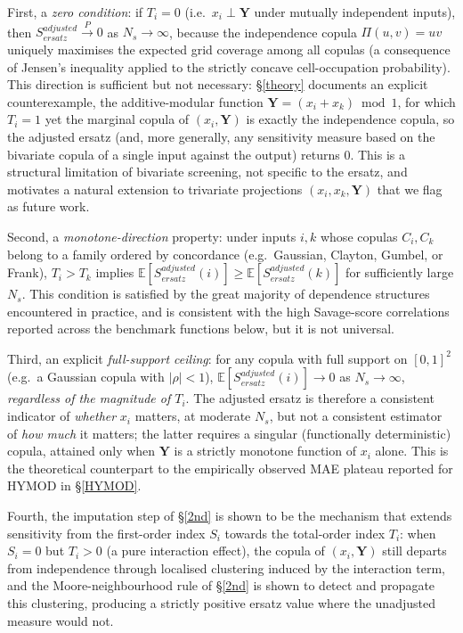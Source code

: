 \documentclass[12pt]{article}
\begin{document}
First, a \emph{zero condition}: if $T_i = 0$ (i.e.\ $x_i \perp \bm Y$ under mutually independent inputs), then $S^{adjusted}_{ersatz} \xrightarrow{P} 0$ as $N_s \to \infty$, because the independence copula $\Pi(u,v)=uv$ uniquely maximises the expected grid coverage among all copulas (a consequence of Jensen's inequality applied to the strictly concave cell-occupation probability). This direction is sufficient but not necessary: \S\ref{theory} documents an explicit counterexample, the additive-modular function $\bm Y = (x_i + x_k) \bmod 1$, for which $T_i = 1$ yet the marginal copula of $(x_i, \bm Y)$ is exactly the independence copula, so the adjusted ersatz (and, more generally, any sensitivity measure based on the bivariate copula of a single input against the output) returns $0$. This is a structural limitation of bivariate screening, not specific to the ersatz, and motivates a natural extension to trivariate projections $(x_i, x_k, \bm Y)$ that we flag as future work.

Second, a \emph{monotone-direction} property: under inputs $i, k$ whose copulas $C_i, C_k$ belong to a family ordered by concordance (e.g.\ Gaussian, Clayton, Gumbel, or Frank), $T_i > T_k$ implies $\mathbb{E}[S^{adjusted}_{ersatz}(i)] \ge \mathbb{E}[S^{adjusted}_{ersatz}(k)]$ for sufficiently large $N_s$. This condition is satisfied by the great majority of dependence structures encountered in practice, and is consistent with the high Savage-score correlations reported across the benchmark functions below, but it is not universal.

Third, an explicit \emph{full-support ceiling}: for any copula with full support on $[0,1]^2$ (e.g.\ a Gaussian copula with $|\rho|<1$), $\mathbb{E}[S^{adjusted}_{ersatz}(i)] \to 0$ as $N_s \to \infty$, \emph{regardless of the magnitude of $T_i$}. The adjusted ersatz is therefore a consistent indicator of \emph{whether} $x_i$ matters, at moderate $N_s$, but not a consistent estimator of \emph{how much} it matters; the latter requires a singular (functionally deterministic) copula, attained only when $\bm Y$ is a strictly monotone function of $x_i$ alone. This is the theoretical counterpart to the empirically observed MAE plateau reported for HYMOD in \S\ref{HYMOD}.

Fourth, the imputation step of \S\ref{2nd} is shown to be the mechanism that extends sensitivity from the first-order index $S_i$ towards the total-order index $T_i$: when $S_i = 0$ but $T_i > 0$ (a pure interaction effect), the copula of $(x_i, \bm Y)$ still departs from independence through localised clustering induced by the interaction term, and the Moore-neighbourhood rule of \S\ref{2nd} is shown to detect and propagate this clustering, producing a strictly positive ersatz value where the unadjusted measure would not.
\end{document}
